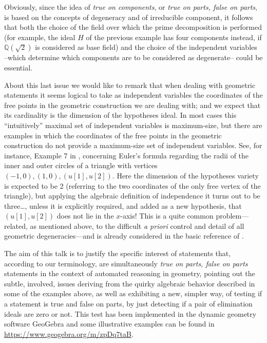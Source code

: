\documentclass{article}
\begin{document}
 Obviously, since the idea of \emph{true on components}, or \emph{true on parts, false on parts}, is based on the concepts of degeneracy and of irreducible component, it follows that both the choice of the field over which the prime decomposition is performed (for example, the ideal $ H $ of the previous example has four components instead, if  
  $\mathbb{Q}(\sqrt{2})$ is considered as base field) and the choice of the independent variables --which determine which components are to be considered as degenerate-- could be essential. 
 
  
  About this last issue we would like to remark that when dealing with geometric statements it seems logical to take as independent variables the coordinates of the free points in the geometric construction we are dealing with; and we expect that its cardinality is the dimension of the hypotheses ideal. In most cases this ``intuitively'' maximal set of independent variables is maximum-size, but there are examples in which the coordinates of the free points in the geometric construction do not provide a maximum-size set of independent variables. See,  for instance,  Example 7 in \cite{DR}, concerning Euler's formula regarding the radii of the inner and outer circles of a triangle with vertices $(-1,0),(1,0), (u[1],u[2])$. Here the dimension of the hypotheses variety is expected to be 2 (referring to the two coordinates of the only free vertex of the triangle), but applying the algebraic definition of independence it turns out to be three\dots , unless it is explicitly required, and added as a  new hypothesis, that $(u[1],u[2])$ does not lie in the $x$-axis! This is a quite common problem---related, as mentioned above, to the difficult  \emph{a priori} control and detail of all geometric degeneracies---and is already considered in the basic reference of \cite{Chou}.  
  
 
The aim of this talk is to justify the specific interest of statements that, according to our terminology,  are simultaneously \emph{true on parts, false on parts} statements in the context of automated reasoning in geometry,  pointing out the subtle, involved, issues deriving from the  quirky algebraic behavior described in some of the examples above, as well as  exhibiting a new,  simpler way,  of testing if a statement is true and false on parts, by just detecting if a pair of elimination ideals are zero or not. This test has been implemented in the dynamic geometry software GeoGebra and some  illustrative examples can be found in \url{https://www.geogebra.org/m/zpDq7taB}. 
  
\end{document}
